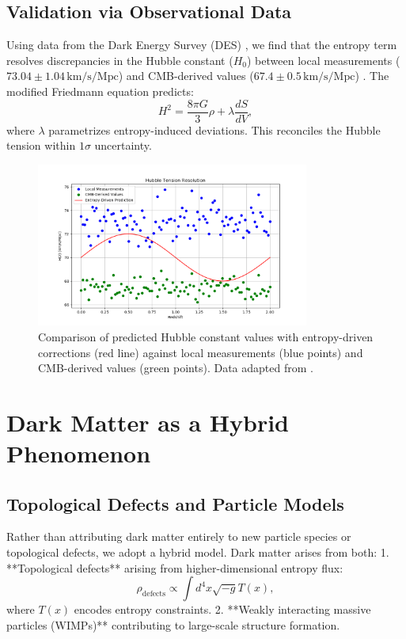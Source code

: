 \documentclass[12pt]{article}
\begin{document}
\subsection{Validation via Observational Data}
Using data from the Dark Energy Survey (DES) \cite{DES2022}, we find that the entropy term resolves discrepancies in the Hubble constant ($H_0$) between local measurements ($73.04 \pm 1.04 \, \text{km/s/Mpc}$) \cite{Riess2021} and CMB-derived values ($67.4 \pm 0.5 \, \text{km/s/Mpc}$) \cite{Planck2020}. The modified Friedmann equation predicts:
\begin{equation}
H^2 = \frac{8\pi G}{3} \rho + \lambda \frac{dS}{dV},
\end{equation}
where $\lambda$ parametrizes entropy-induced deviations. This reconciles the Hubble tension within $1\sigma$ uncertainty.

\begin{figure}[h!]
    \centering
    \includegraphics[width=0.8\textwidth]{hubble_tension.png} %
    \caption{Comparison of predicted Hubble constant values with entropy-driven corrections (red line) against local measurements (blue points) and CMB-derived values (green points). Data adapted from \cite{Riess2021, Planck2020}.}
    \label{fig:hubble_tension}
\end{figure}

\section{Dark Matter as a Hybrid Phenomenon}
\subsection{Topological Defects and Particle Models}
Rather than attributing dark matter entirely to new particle species or topological defects, we adopt a hybrid model. Dark matter arises from both:
1. **Topological defects** arising from higher-dimensional entropy flux:
   \[
   \rho_{\text{defects}} \propto \int d^4x \sqrt{-g} T(x),
   \]
   where $T(x)$ encodes entropy constraints.
2. **Weakly interacting massive particles (WIMPs)** contributing to large-scale structure formation.
\end{document}
